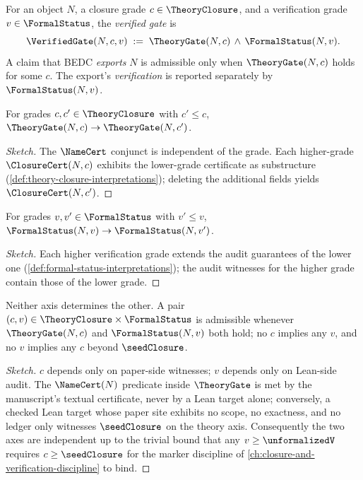 \begin{definition}
\label{def:verified-gate}
For an object $N$, a closure grade $c \in \TheoryClosure$, and a verification grade $v \in \FormalStatus$, the \emph{verified gate} is
$$
  \VerifiedGate(N, c, v) \;:=\; \TheoryGate(N, c) \,\wedge\, \FormalStatus(N, v).
$$
A claim that BEDC \emph{exports} $N$ is admissible only when $\TheoryGate(N, c)$ holds for some $c$. The export's \emph{verification} is reported separately by $\FormalStatus(N, v)$.
\end{definition}

\begin{theorem}
\label{thm:theory-gate-monotone}
For grades $c, c' \in \TheoryClosure$ with $c' \le c$, $\TheoryGate(N, c) \to \TheoryGate(N, c')$.
\end{theorem}
\begin{proof}[Sketch]
The $\NameCert$ conjunct is independent of the grade. Each higher-grade $\ClosureCert(N, c)$ exhibits the lower-grade certificate as substructure (\autoref{def:theory-closure-interpretations}); deleting the additional fields yields $\ClosureCert(N, c')$.
\end{proof}

\begin{theorem}
\label{thm:formal-status-monotone}
For grades $v, v' \in \FormalStatus$ with $v' \le v$, $\FormalStatus(N, v) \to \FormalStatus(N, v')$.
\end{theorem}
\begin{proof}[Sketch]
Each higher verification grade extends the audit guarantees of the lower one (\autoref{def:formal-status-interpretations}); the audit witnesses for the higher grade contain those of the lower grade.
\end{proof}

\begin{theorem}
\label{thm:axes-independent}
Neither axis determines the other. A pair $(c, v) \in \TheoryClosure \times \FormalStatus$ is admissible whenever $\TheoryGate(N, c)$ and $\FormalStatus(N, v)$ both hold; no $c$ implies any $v$, and no $v$ implies any $c$ beyond $\seedClosure$.
\end{theorem}
\begin{proof}[Sketch]
$c$ depends only on paper-side witnesses; $v$ depends only on Lean-side audit. The $\NameCert(N)$ predicate inside $\TheoryGate$ is met by the manuscript's textual certificate, never by a Lean target alone; conversely, a checked Lean target whose paper site exhibits no scope, no exactness, and no ledger only witnesses $\seedClosure$ on the theory axis. Consequently the two axes are independent up to the trivial bound that any $v \ge \unformalizedV$ requires $c \ge \seedClosure$ for the marker discipline of \autoref{ch:closure-and-verification-discipline} to bind.
\end{proof}

